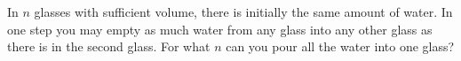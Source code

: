 In $n$ glasses with sufficient volume, there is initially the same amount of water. In one step you may empty as much water from any glass into any other glass as there is in the second glass. For what $n$ can you pour all the water into one glass?
